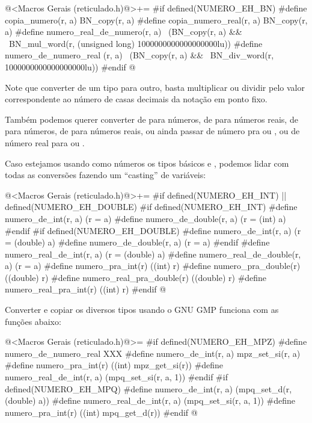\iniciocodigo
@<Macros Gerais (reticulado.h)@>+=
#if defined(NUMERO_EH_BN)
#define copia_numero(r, a) BN_copy(r, a)
#define copia_numero_real(r, a) BN_copy(r, a)
#define numero_real_de_numero(r, a) \
          (BN_copy(r, a) &&         \
          BN_mul_word(r, (unsigned long) 1000000000000000000lu))
#define numero_de_numero_real (r, a) \
          (BN_copy(r, a) &&          \
           BN_div_word(r, 1000000000000000000lu))
#endif
@
\fimcodigo

Note que converter de um tipo para outro, basta multiplicar ou dividir
pelo valor correspondente ao número de casas decimais da notação em
ponto fixo.







Também podemos querer converter de  para
números, de \monoespaco{int} para números reais,
de  para números, de  para
números reais, ou ainda passar de número pra 
ou , ou de número real para 
ou \monoespaco{double}.

Caso estejamos usando como números os tipos básicos 
e \monoespaco{double}, podemos lidar com todas as conversões fazendo
um ``casting'' de variáveis:

\iniciocodigo
@<Macros Gerais (reticulado.h)@>+=
#if defined(NUMERO_EH_INT) || defined(NUMERO_EH_DOUBLE)
#if defined(NUMERO_EH_INT)
#define numero_de_int(r, a) (r = a)%
#define numero_de_double(r, a) (r = (int) a)
#endif
#if defined(NUMERO_EH_DOUBLE)
#define numero_de_int(r, a) (r = (double) a)%
#define numero_de_double(r, a) (r = a)
#endif
#define numero_real_de_int(r, a) (r = (double) a)%
#define numero_real_de_double(r, a) (r = a)
#define numero_pra_int(r) ((int) r)%
#define numero_pra_double(r) ((double) r)
#define numero_real_pra_double(r) ((double) r)
#define numero_real_pra_int(r) ((int) r)
#endif
@
\fimcodigo

Converter e copiar os diversos tipos usando o GNU GMP funciona com as
funções abaixo:

\iniciocodigo
@<Macros Gerais (reticulado.h)@>=
#if defined(NUMERO_EH_MPZ)
#define numero_de_numero_real XXX
#define numero_de_int(r, a) mpz_set_si(r, a)
#define numero_pra_int(r) ((int) mpz_get_si(r))
#define numero_real_de_int(r, a) (mpq_set_si(r, a, 1))
#endif
#if defined(NUMERO_EH_MPQ)
#define numero_de_int(r, a) (mpq_set_d(r, (double) a))
#define numero_real_de_int(r, a) (mpq_set_si(r, a, 1))
#define numero_pra_int(r) ((int) mpq_get_d(r))
#endif
@
\fimcodigo


